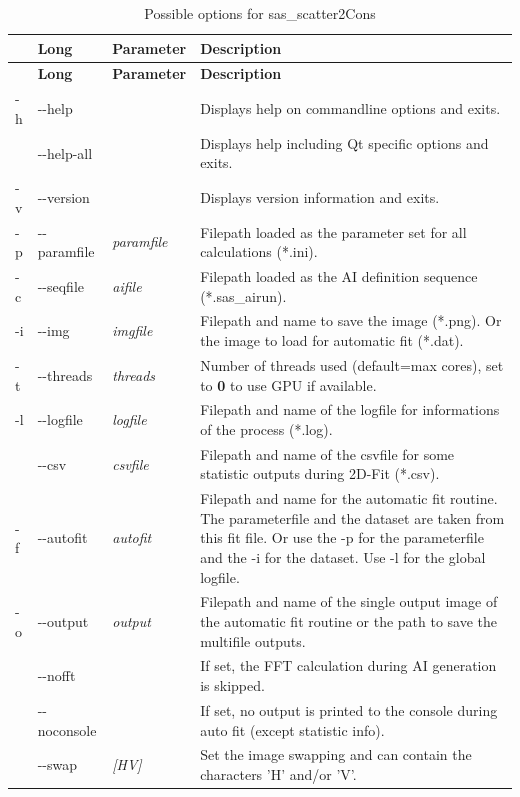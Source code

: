 \documentclass[11pt]{article} %
\begin{document}
\begin{longtable}{|L{1cm}|L{2cm}|C{2cm}|L{12cm}|}
\caption{Possible options for sas\_scatter2Cons} \\
\hline{} & {\bf Long} & {\bf Parameter} & {\bf Description} \\
\endfirsthead
\hline{} & {\bf Long} & {\bf Parameter} & {\bf Description} \\
\endhead
\hline
-h & -{}-help & & Displays help on commandline options and exits. \\ \hline
 & -{}-help-all & & Displays help including Qt specific options and exits. \\ \hline
-v & -{}-version & & Displays version information and exits. \\ \hline
-p & -{}-paramfile & {\it paramfile} & Filepath loaded as the parameter set for all calculations (*.ini). \\ \hline
-c & -{}-seqfile & {\it aifile} & Filepath loaded as the AI definition sequence (*.sas\_airun). \\ \hline
-i & -{}-img & {\it imgfile} & Filepath and name to save the image (*.png). Or the image to load for automatic fit (*.dat). \\ \hline
-t & -{}-threads & {\it threads} & Number of threads used (default=max cores), set to {\bf 0} to use GPU if available. \\ \hline
-l & -{}-logfile & {\it logfile} & Filepath and name of the logfile for informations of the process (*.log). \\ \hline
 & -{}-csv & {\it csvfile} & Filepath and name of the csvfile for some statistic outputs during 2D-Fit (*.csv). \\ \hline
-f & -{}-autofit & {\it autofit} & Filepath and name for the automatic fit routine. The parameterfile and the dataset are taken from this fit file. Or use the -p for the parameterfile and the -i for the dataset. Use -l for the global logfile. \\ \hline
-o & -{}-output & {\it output} & Filepath and name of the single output image of the automatic fit routine or the path to save the  multifile outputs. \\ \hline
 & -{}-nofft & & If set, the FFT calculation during AI generation is skipped. \\ \hline
 & -{}-noconsole & & If set, no output is printed to the console during auto fit (except statistic info). \\ \hline
 & -{}-swap & {\it [HV]} & Set the image swapping and can contain the characters 'H' and/or 'V'. \\ \hline

\end{longtable}
\end{document}
